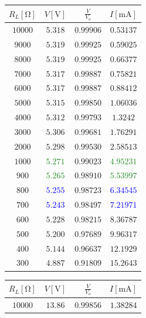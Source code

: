 \begin{table}[H]
	\begin{subtable}[c]{0.5\textwidth}
		\centering
			\begin{tabular}{ c | c | c | c}
			$R_L [\unit{\ohm}]$ & $V [\unit{\volt}]$ & $\frac{V}{V_o}$ & $I [\unit{\milli\ampere}]$ \\
			\hline
			$10000$ & $5.318$ & $0.99906$ & $0.53137$ \\
			$9000$ & $5.319$ & $0.99925$ & $0.59025$ \\
			$8000$ & $5.319$ & $0.99925$ & $0.66377$ \\
			$7000$ & $5.317$ & $0.99887$ & $0.75821$ \\
			$6000$ & $5.317$ & $0.99887$ & $0.88412$ \\
			$5000$ & $5.315$ & $0.99850$ & $1.06036$ \\
			$4000$ & $5.312$ & $0.99793$ & $1.3242$ \\
			$3000$ & \textcolor{BrickRed}{$5.306$} & $0.99681$ & 	\textcolor{BrickRed}{$1.76291$} \\
			$2000$ &	\textcolor{BrickRed}{$5.298$} & $0.99530$ & 	\textcolor{BrickRed}{$2.58513$} \\
			$1000$ & 	\textcolor{ForestGreen}{$5.271$} & $0.99023$ & 	\textcolor{ForestGreen}{$4.95231$} \\
			$900$ & 	\textcolor{ForestGreen}{$5.265$} & $0.98910$ & 	\textcolor{ForestGreen}{$5.53997$} \\
			$800$ & 	\textcolor{blue}{$5.255$} & $0.98723$ & \textcolor{blue}{$6.34545$} \\
			$700$ & \textcolor{blue}{$5.243$} & $0.98497$ & \textcolor{blue}{$7.21971$} \\
			$600$ & $5.228$ & $0.98215$ & $8.36787$ \\
			$500$ & $5.200$ & $0.97689$ & $9.96317$ \\
			$400$ & $5.144$ & $0.96637$ & $12.1929$ \\
			$300$ & $4.887$ & $0.91809$ & $15.2643$ \\
		\end{tabular}
	\end{subtable}
	\begin{subtable}[c]{0.5\textwidth}
		\centering
			\begin{tabular}{ c | c | c | c}
			$R_L [\unit{\ohm}]$ & $V [\unit{\volt}]$ & $\frac{V}{V_o}$ & $I [\unit{\milli\ampere}]$ \\
			\hline
			$10000$ & $13.86$ & $0.99856$ & $1.38284$ \\

\end{tabular}
\end{subtable}
\end{table}
